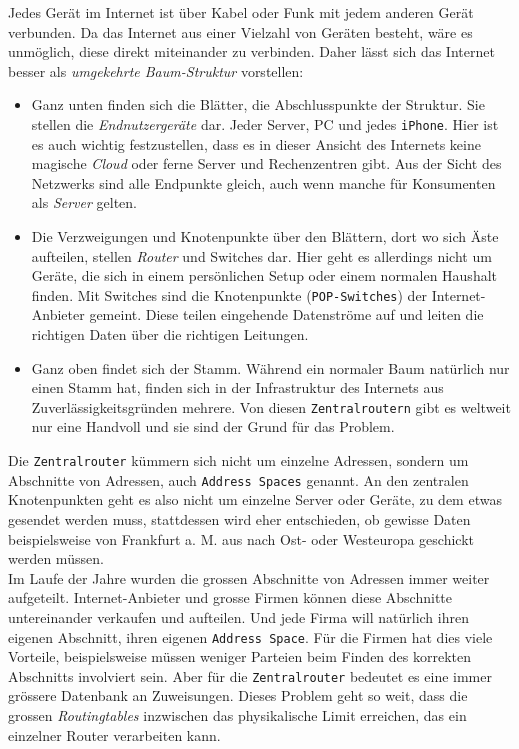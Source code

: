 \documentclass[11pt]{article}
\begin{document}
\noindent Jedes Gerät im Internet ist über Kabel oder Funk mit jedem
anderen Gerät verbunden. Da das Internet aus einer Vielzahl von
Geräten besteht, wäre es unmöglich, diese direkt miteinander zu
verbinden. Daher lässt sich das Internet besser als \emph{umgekehrte
Baum-Struktur} vorstellen:
\begin{itemize}
\item Ganz unten finden sich die Blätter, die Abschlusspunkte der
Struktur. Sie stellen die \emph{Endnutzergeräte} dar. Jeder Server, PC und
jedes \texttt{iPhone}. Hier ist es auch wichtig festzustellen, dass es in
dieser Ansicht des Internets keine magische \emph{Cloud} oder ferne Server
und Rechenzentren gibt. Aus der Sicht des Netzwerks sind alle
Endpunkte gleich, auch wenn manche für Konsumenten als \emph{Server}
gelten.
\item Die Verzweigungen und Knotenpunkte über den Blättern, dort wo sich
Äste aufteilen, stellen \emph{Router} und Switches dar. Hier geht es
allerdings nicht um Geräte, die sich in einem persönlichen Setup
oder einem normalen Haushalt finden. Mit Switches sind die
Knotenpunkte (\texttt{POP-Switches}) der Internet-Anbieter gemeint. Diese
teilen eingehende Datenströme auf und leiten die richtigen Daten
über die richtigen Leitungen.
\item Ganz oben findet sich der Stamm. Während ein normaler Baum natürlich
nur einen Stamm hat, finden sich in der Infrastruktur des Internets
aus Zuverlässigkeitsgründen mehrere. Von diesen \texttt{Zentralroutern} gibt
es weltweit nur eine Handvoll und sie sind der Grund für das
Problem.
\end{itemize}

\noindent Die \texttt{Zentralrouter} kümmern sich nicht um einzelne Adressen,
sondern um Abschnitte von Adressen, auch \texttt{Address Spaces} genannt. An
den zentralen Knotenpunkten geht es also nicht um einzelne Server oder
Geräte, zu dem etwas gesendet werden muss, stattdessen wird eher
entschieden, ob gewisse Daten beispielsweise von Frankfurt a. M. aus
nach Ost- oder Westeuropa geschickt werden müssen.\\

\noindent Im Laufe der Jahre wurden die grossen Abschnitte von
Adressen immer weiter aufgeteilt. Internet-Anbieter und grosse Firmen
können diese Abschnitte untereinander verkaufen und aufteilen. Und
jede Firma will natürlich ihren eigenen Abschnitt, ihren eigenen
\texttt{Address Space}. Für die Firmen hat dies viele Vorteile, beispielsweise
müssen weniger Parteien beim Finden des korrekten Abschnitts
involviert sein. Aber für die \texttt{Zentralrouter} bedeutet es eine immer
grössere Datenbank an Zuweisungen. Dieses Problem geht so weit, dass
die grossen \emph{Routingtables} inzwischen das physikalische Limit
erreichen, das ein einzelner Router verarbeiten kann.\\
\end{document}
